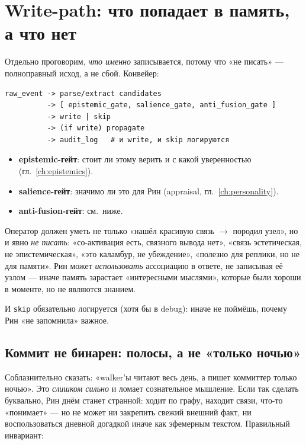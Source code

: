\section{Write-path: что попадает в память, а что нет}
\label{sec:writepath}

Отдельно проговорим, \emph{что именно} записывается, потому что «не писать» —
полноправный исход, а не сбой. Конвейер:
\begin{lstlisting}[style=pseudo]
raw_event -> parse/extract candidates
          -> [ epistemic_gate, salience_gate, anti_fusion_gate ]
          -> write | skip
          -> (if write) propagate
          -> audit_log   # и write, и skip логируются
\end{lstlisting}
\begin{itemize}\itemsep1pt
\item \textbf{epistemic-гейт}: стоит ли этому верить и с какой уверенностью (гл.~\ref{ch:epistemics}).
\item \textbf{salience-гейт}: значимо ли это для Рин (appraisal, гл.~\ref{ch:personality}).
\item \textbf{anti-fusion-гейт}: см.\ ниже.
\end{itemize}

\begin{principle}
Оператор должен уметь не только «нашёл красивую связь $\to$ породил узел», но и
явно \emph{не писать}: «со-активация есть, связного вывода нет», «связь эстетическая,
не эпистемическая», «это каламбур, не убеждение», «полезно для реплики, но не для
памяти». Рин может \emph{использовать} ассоциацию в ответе, не записывая её узлом —
иначе память зарастает «интересными мыслями», которые были хороши в моменте, но не
являются знанием.
\end{principle}

И \texttt{skip} обязательно логируется (хотя бы в debug): иначе не поймёшь, почему
Рин «не запомнила» важное.

\subsection{Коммит не бинарен: полосы, а не «только ночью»}
\label{sec:commitlanes}

Соблазнительно сказать: «walker'ы читают весь день, а пишет коммиттер только ночью».
Это \emph{слишком сильно} и ломает сознательное мышление. Если так сделать буквально,
Рин днём станет странной: ходит по графу, находит связи, что-то «понимает» — но не может
ни закрепить свежий внешний факт, ни воспользоваться дневной догадкой иначе как
эфемерным текстом. Правильный инвариант:

